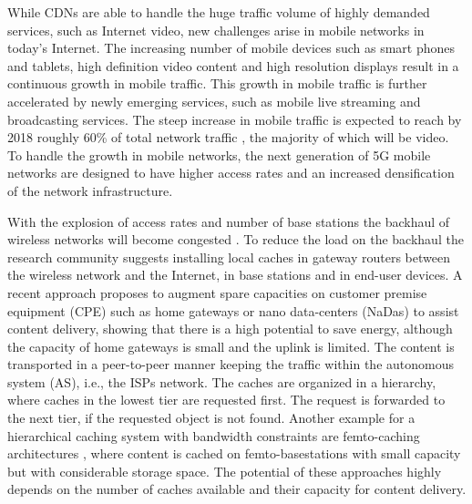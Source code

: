 While CDNs are able to handle the huge traffic volume of highly demanded services, such as Internet video, new challenges arise in mobile networks in today's Internet.
The increasing number of mobile devices such as smart phones and tablets, high definition video content and high resolution displays result in a continuous growth in mobile traffic.
This growth in mobile traffic is further accelerated by newly emerging services, such as mobile live streaming and broadcasting services.
The steep increase in mobile traffic is expected to reach by 2018 roughly 60\% of total network traffic \cite{cisco2016}, the majority of which will be video.
To handle the growth in mobile networks, the next generation of 5G mobile networks are designed to have higher access rates and an increased densification of the network infrastructure.

With the explosion of access rates and number of base stations the backhaul of wireless networks will become congested \cite{paschos2016wireless}.
To reduce the load on the backhaul the research community suggests installing local caches in gateway routers between the wireless network and the Internet, in base stations and in end-user devices.
A recent approach \cite{valancius2009greening} proposes to augment spare capacities on customer premise equipment (CPE) such as home gateways or nano data-centers (NaDas) to assist content delivery, showing that there is a high potential to save energy, although the capacity of home gateways is small and the uplink is limited.
The content is transported in a peer-to-peer manner keeping the traffic within the autonomous system (AS), i.e., the ISPs network.
The caches are organized in a hierarchy, where caches in the lowest tier are requested first. The request is forwarded to the next tier, if the requested object is not found.
Another example for a hierarchical caching system with bandwidth constraints are femto-caching architectures \cite{golrezaei2013femtocaching}, where content is cached on femto-basestations with small capacity but with considerable storage space.
The potential of these approaches highly depends on the number of caches available and their capacity for content delivery.

